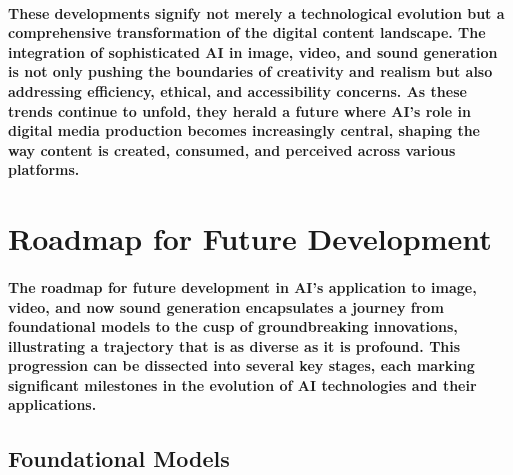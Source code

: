\documentclass[11pt,a4paper,oneside]{report}
\begin{document}
\paragraph{These developments signify not merely a technological evolution but a comprehensive transformation of the digital content landscape. The integration of sophisticated AI in image, video, and sound generation is not only pushing the boundaries of creativity and realism but also addressing efficiency, ethical, and accessibility concerns. As these trends continue to unfold, they herald a future where AI's role in digital media production becomes increasingly central, shaping the way content is created, consumed, and perceived across various platforms.}
\section{Roadmap for Future Development}

\paragraph{The roadmap for future development in AI's application to image, video, and now sound generation encapsulates a journey from foundational models to the cusp of groundbreaking innovations, illustrating a trajectory that is as diverse as it is profound. This progression can be dissected into several key stages, each marking significant milestones in the evolution of AI technologies and their applications.}

\subsection{Foundational Models}
\end{document}
